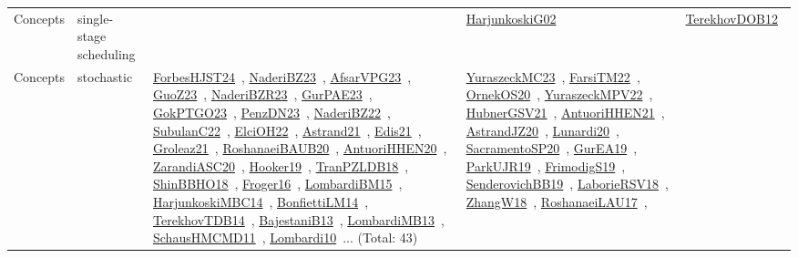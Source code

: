 {\begin{longtable}{lp{3cm}>{\raggedright\arraybackslash}p{6cm}>{\raggedright\arraybackslash}p{6cm}>{\raggedright\arraybackslash}p{8cm}}
Concepts & single-stage scheduling &  & \href{../works/HarjunkoskiG02.pdf}{HarjunkoskiG02}~\cite{HarjunkoskiG02} & \href{../works/TerekhovDOB12.pdf}{TerekhovDOB12}~\cite{TerekhovDOB12}\\
Concepts & stochastic & \href{../works/ForbesHJST24.pdf}{ForbesHJST24}~\cite{ForbesHJST24}, \href{../works/NaderiBZ23.pdf}{NaderiBZ23}~\cite{NaderiBZ23}, \href{../works/AfsarVPG23.pdf}{AfsarVPG23}~\cite{AfsarVPG23}, \href{../works/GuoZ23.pdf}{GuoZ23}~\cite{GuoZ23}, \href{../works/NaderiBZR23.pdf}{NaderiBZR23}~\cite{NaderiBZR23}, \href{../works/GurPAE23.pdf}{GurPAE23}~\cite{GurPAE23}, \href{../works/GokPTGO23.pdf}{GokPTGO23}~\cite{GokPTGO23}, \href{../works/PenzDN23.pdf}{PenzDN23}~\cite{PenzDN23}, \href{../works/NaderiBZ22.pdf}{NaderiBZ22}~\cite{NaderiBZ22}, \href{../works/SubulanC22.pdf}{SubulanC22}~\cite{SubulanC22}, \href{../works/ElciOH22.pdf}{ElciOH22}~\cite{ElciOH22}, \href{../works/Astrand21.pdf}{Astrand21}~\cite{Astrand21}, \href{../works/Edis21.pdf}{Edis21}~\cite{Edis21}, \href{../works/Groleaz21.pdf}{Groleaz21}~\cite{Groleaz21}, \href{../works/RoshanaeiBAUB20.pdf}{RoshanaeiBAUB20}~\cite{RoshanaeiBAUB20}, \href{../works/AntuoriHHEN20.pdf}{AntuoriHHEN20}~\cite{AntuoriHHEN20}, \href{../works/ZarandiASC20.pdf}{ZarandiASC20}~\cite{ZarandiASC20}, \href{../works/Hooker19.pdf}{Hooker19}~\cite{Hooker19}, \href{../works/TranPZLDB18.pdf}{TranPZLDB18}~\cite{TranPZLDB18}, \href{../works/ShinBBHO18.pdf}{ShinBBHO18}~\cite{ShinBBHO18}, \href{../works/Froger16.pdf}{Froger16}~\cite{Froger16}, \href{../works/LombardiBM15.pdf}{LombardiBM15}~\cite{LombardiBM15}, \href{../works/HarjunkoskiMBC14.pdf}{HarjunkoskiMBC14}~\cite{HarjunkoskiMBC14}, \href{../works/BonfiettiLM14.pdf}{BonfiettiLM14}~\cite{BonfiettiLM14}, \href{../works/TerekhovTDB14.pdf}{TerekhovTDB14}~\cite{TerekhovTDB14}, \href{../works/BajestaniB13.pdf}{BajestaniB13}~\cite{BajestaniB13}, \href{../works/LombardiMB13.pdf}{LombardiMB13}~\cite{LombardiMB13}, \href{../works/SchausHMCMD11.pdf}{SchausHMCMD11}~\cite{SchausHMCMD11}, \href{../works/Lombardi10.pdf}{Lombardi10}~\cite{Lombardi10}... (Total: 43) & \href{../works/YuraszeckMC23.pdf}{YuraszeckMC23}~\cite{YuraszeckMC23}, \href{../works/FarsiTM22.pdf}{FarsiTM22}~\cite{FarsiTM22}, \href{../works/OrnekOS20.pdf}{OrnekOS20}~\cite{OrnekOS20}, \href{../works/YuraszeckMPV22.pdf}{YuraszeckMPV22}~\cite{YuraszeckMPV22}, \href{../works/HubnerGSV21.pdf}{HubnerGSV21}~\cite{HubnerGSV21}, \href{../works/AntuoriHHEN21.pdf}{AntuoriHHEN21}~\cite{AntuoriHHEN21}, \href{../works/AstrandJZ20.pdf}{AstrandJZ20}~\cite{AstrandJZ20}, \href{../works/Lunardi20.pdf}{Lunardi20}~\cite{Lunardi20}, \href{../works/SacramentoSP20.pdf}{SacramentoSP20}~\cite{SacramentoSP20}, \href{../works/GurEA19.pdf}{GurEA19}~\cite{GurEA19}, \href{../works/ParkUJR19.pdf}{ParkUJR19}~\cite{ParkUJR19}, \href{../works/FrimodigS19.pdf}{FrimodigS19}~\cite{FrimodigS19}, \href{../works/SenderovichBB19.pdf}{SenderovichBB19}~\cite{SenderovichBB19}, \href{../works/LaborieRSV18.pdf}{LaborieRSV18}~\cite{LaborieRSV18}, \href{../works/ZhangW18.pdf}{ZhangW18}~\cite{ZhangW18}, \href{../works/RoshanaeiLAU17.pdf}{RoshanaeiLAU17}~\cite{RoshanaeiLAU17}, 
\end{longtable}}
